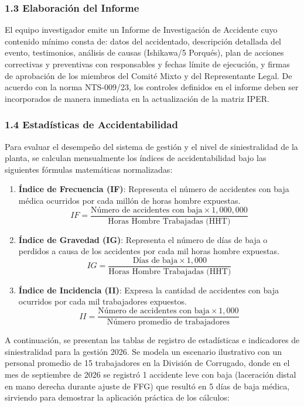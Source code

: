 \documentclass[11pt, letterpaper]{article}
\begin{document}
\subsubsection{1.3 Elaboración del Informe}
El equipo investigador emite un Informe de Investigación de Accidente cuyo contenido mínimo consta de: datos del accidentado, descripción detallada del evento, testimonios, análisis de causas (Ishikawa/5 Porqués), plan de acciones correctivas y preventivas con responsables y fechas límite de ejecución, y firmas de aprobación de los miembros del Comité Mixto y del Representante Legal. De acuerdo con la norma NTS-009/23, los controles definidos en el informe deben ser incorporados de manera inmediata en la actualización de la matriz IPER.

\subsubsection{1.4 Estadísticas de Accidentabilidad}
Para evaluar el desempeño del sistema de gestión y el nivel de siniestralidad de la planta, se calculan mensualmente los índices de accidentabilidad bajo las siguientes fórmulas matemáticas normalizadas:
\begin{enumerate}
    \item \textbf{Índice de Frecuencia (IF)}: Representa el número de accidentes con baja médica ocurridos por cada millón de horas hombre expuestas.
    \begin{equation}
        IF = \frac{\text{Número de accidentes con baja} \times 1,000,000}{\text{Horas Hombre Trabajadas (HHT)}}
    \end{equation}
    \item \textbf{Índice de Gravedad (IG)}: Representa el número de días de baja o perdidos a causa de los accidentes por cada mil horas hombre expuestas.
    \begin{equation}
        IG = \frac{\text{Días de baja} \times 1,000}{\text{Horas Hombre Trabajadas (HHT)}}
    \end{equation}
    \item \textbf{Índice de Incidencia (II)}: Expresa la cantidad de accidentes con baja ocurridos por cada mil trabajadores expuestos.
    \begin{equation}
        II = \frac{\text{Número de accidentes con baja} \times 1,000}{\text{Número promedio de trabajadores}}
    \end{equation}
\end{enumerate}

A continuación, se presentan las tablas de registro de estadísticas e indicadores de siniestralidad para la gestión 2026. Se modela un escenario ilustrativo con un personal promedio de 15 trabajadores en la División de Corrugado, donde en el mes de septiembre de 2026 se registró 1 accidente leve con baja (laceración distal en mano derecha durante ajuste de FFG) que resultó en 5 días de baja médica, sirviendo para demostrar la aplicación práctica de los cálculos:
\end{document}
